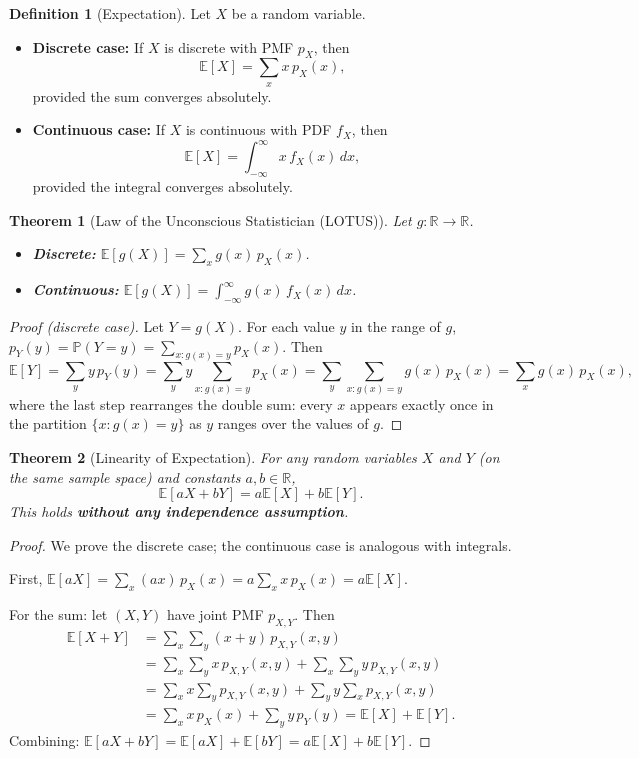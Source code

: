 \documentclass[11pt,a4paper]{article}
\theoremstyle{definition}
\newtheorem{definition}{Definition}[section]
\theoremstyle{plain}
\newtheorem{theorem}{Theorem}[section]
\theoremstyle{remark}
\newcommand{\R}{\mathbb{R}}
\newcommand{\E}{\mathbb{E}}
\newcommand{\Prob}{\mathbb{P}}
\begin{document}
\begin{definition}[Expectation]
\label{def:expectation}
Let $X$ be a random variable.
\begin{itemize}[nosep]
    \item \textbf{Discrete case:} If $X$ is discrete with PMF $p_X$, then
    \[
        \E[X] = \sum_x x \, p_X(x),
    \]
    provided the sum converges absolutely.
    \item \textbf{Continuous case:} If $X$ is continuous with PDF $f_X$, then
    \[
        \E[X] = \int_{-\infty}^\infty x \, f_X(x)\,dx,
    \]
    provided the integral converges absolutely.
\end{itemize}
\end{definition}

\begin{theorem}[Law of the Unconscious Statistician (LOTUS)]
\label{thm:lotus}
Let $g \colon \R \to \R$.
\begin{itemize}[nosep]
    \item \textbf{Discrete:} $\E[g(X)] = \sum_x g(x)\,p_X(x)$.
    \item \textbf{Continuous:} $\E[g(X)] = \int_{-\infty}^\infty g(x)\,f_X(x)\,dx$.
\end{itemize}
\end{theorem}

\begin{proof}[Proof (discrete case)]
Let $Y = g(X)$. For each value $y$ in the range of $g$,
$p_Y(y) = \Prob(Y = y) = \sum_{x : g(x) = y} p_X(x)$.
Then
\[
    \E[Y] = \sum_y y \, p_Y(y) = \sum_y y \sum_{x : g(x) = y} p_X(x)
    = \sum_y \sum_{x : g(x) = y} g(x)\,p_X(x) = \sum_x g(x)\,p_X(x),
\]
where the last step rearranges the double sum: every $x$ appears exactly once in the
partition $\{x : g(x) = y\}$ as $y$ ranges over the values of $g$.
\end{proof}

\begin{theorem}[Linearity of Expectation]
\label{thm:linearity}
For any random variables $X$ and $Y$ (on the same sample space) and constants $a, b \in \R$,
\[
    \E[aX + bY] = a\E[X] + b\E[Y].
\]
This holds \textbf{without any independence assumption}.
\end{theorem}

\begin{proof}
We prove the discrete case; the continuous case is analogous with integrals.

First, $\E[aX] = \sum_x (ax)\,p_X(x) = a\sum_x x\,p_X(x) = a\E[X]$.

For the sum: let $(X, Y)$ have joint PMF $p_{X,Y}$. Then
\begin{align*}
    \E[X + Y] &= \sum_x \sum_y (x + y)\,p_{X,Y}(x,y) \\
    &= \sum_x \sum_y x\,p_{X,Y}(x,y) + \sum_x \sum_y y\,p_{X,Y}(x,y) \\
    &= \sum_x x \sum_y p_{X,Y}(x,y) + \sum_y y \sum_x p_{X,Y}(x,y) \\
    &= \sum_x x\,p_X(x) + \sum_y y\,p_Y(y) = \E[X] + \E[Y].
\end{align*}
Combining: $\E[aX + bY] = \E[aX] + \E[bY] = a\E[X] + b\E[Y]$.
\end{proof}
\end{document}
